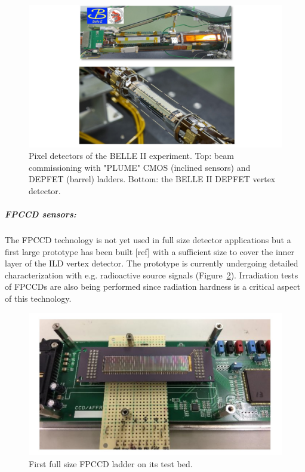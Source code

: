 \begin{figure}[t!]
\centering
\includegraphics[width=1.0\hsize]{Detector/fig/VTX_BELLE2.jpg}
\caption{Pixel detectors of the BELLE II experiment. Top: beam commissioning with "PLUME" CMOS (inclined sensors) and DEPFET (barrel) ladders. Bottom: the BELLE II DEPFET vertex detector.}
\label{fig:det:VTX_BELLE2}
\end{figure}

\subparagraph*{\bf FPCCD sensors: }

The FPCCD technology is not yet used in full size detector applications but a first large prototype has been built [ref] with a sufficient size to cover the inner layer of the ILD vertex detector. The prototype is currently undergoing detailed characterization with e.g. radioactive source signals (Figure~\ref{fig:det:VTX_FPCCD}). Irradiation tests of FPCCDs are also being performed since radiation hardness is a critical aspect of this technology.   

\begin{figure}[t!]
\centering
\includegraphics[width=0.6\hsize]{Detector/fig/VTX_FPCCD.jpg}
\caption{First full size FPCCD ladder on its test bed.}
\label{fig:det:VTX_FPCCD}
\end{figure}

\vspace{2cm}